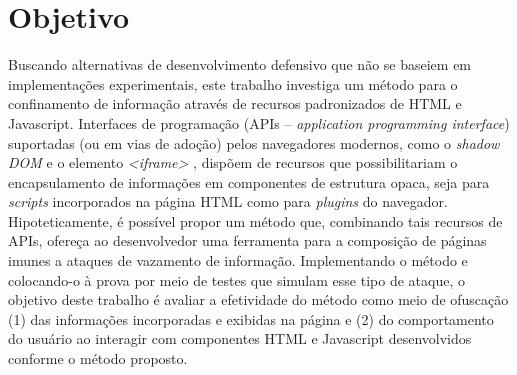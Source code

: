 \section{Objetivo}



Buscando alternativas de desenvolvimento defensivo que não se baseiem em implementações experimentais, este trabalho investiga um método para o confinamento de informação através de recursos padronizados de HTML e Javascript. Interfaces de programação (APIs -- \textit{application programming interface}) suportadas (ou em vias de adoção) pelos navegadores modernos, como o \textit{shadow DOM} \cite{W3C:ShadowDOM} e o elemento \textit{<iframe>} \cite{MDN:iframes}, dispõem de recursos que possibilitariam o encapsulamento de informações em componentes de estrutura opaca, seja para \textit{scripts} incorporados na página HTML como para \textit{plugins} do navegador. Hipoteticamente, é possível propor um método que, combinando tais recursos de APIs, ofereça ao desenvolvedor uma ferramenta para a composição de páginas imunes a ataques de vazamento de informação. Implementando o método e colocando-o à prova por meio de testes que simulam esse tipo de ataque, o objetivo deste trabalho é avaliar a efetividade do método como meio de ofuscação (1) das informações incorporadas e exibidas na página e (2) do comportamento do usuário ao interagir com componentes HTML e Javascript desenvolvidos conforme o método proposto.